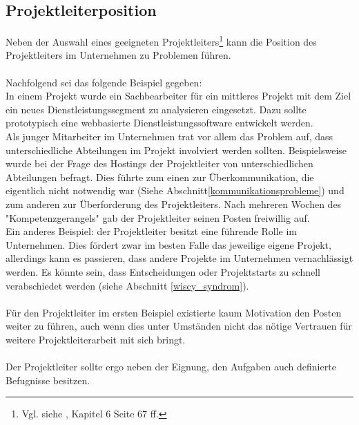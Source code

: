 \documentclass[12pt]{scrartcl}
\begin{document}
\subsection{Projektleiterposition}

Neben der Auswahl eines geeigneten Projektleiters\footnote{Vgl. siehe \cite{proj_zum_erfolg_fuehren}, Kapitel 6 Seite 67 ff.} kann die Position des Projektleiters im Unternehmen zu Problemen führen.\\ 
\\
Nachfolgend sei das folgende Beispiel gegeben:\\
In einem Projekt wurde ein Sachbearbeiter für ein mittleres Projekt mit dem Ziel ein neues Dienstleistungssegment zu analysieren eingesetzt. Dazu sollte prototypisch eine webbasierte Dienstleistungssoftware entwickelt werden.\\
Als junger Mitarbeiter im Unternehmen trat vor allem das Problem auf, dass unterschiedliche Abteilungen im Projekt involviert werden sollten. Beispielsweise wurde bei der Frage des Hostings der Projektleiter von unterschiedlichen Abteilungen befragt. Dies führte zum einen zur Überkommunikation, die eigentlich nicht notwendig war (Siehe Abschnitt\ref{kommunikationsprobleme}) und zum anderen zur Überforderung des Projektleiters. Nach mehreren Wochen des "Kompetenzgerangels" gab der Projektleiter seinen Posten freiwillig auf.\\
Ein anderes Beispiel: der Projektleiter besitzt eine führende Rolle im Unternehmen. Dies fördert zwar im besten Falle das jeweilige eigene Projekt, allerdings kann es passieren, dass andere Projekte im Unternehmen vernachlässigt werden. Es könnte sein, dass Entscheidungen oder Projektstarts zu schnell verabschiedet werden (siehe Abschnitt \ref{wiscy_syndrom}).\\
\\
Für den Projektleiter im ersten Beispiel existierte kaum Motivation den Posten weiter zu führen, auch wenn dies unter Umständen nicht das nötige Vertrauen für weitere Projektleiterarbeit mit sich bringt.\\
\\
Der Projektleiter sollte ergo neben der Eignung, den Aufgaben auch definierte Befugnisse besitzen.


\pagebreak
\end{document}
